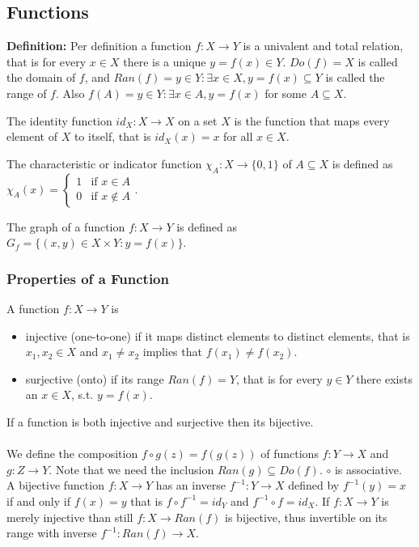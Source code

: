 \documentclass{article}
\begin{document}
\subsection{Functions}
\textbf{Definition:} Per definition a function $f: X \rightarrow Y$ is a univalent and total relation, that is for every $x \in X$ there is a unique $y = f(x) \in Y$. $Do(f) = X$ is called the domain of $f$, and $Ran(f) = {y \in Y: \exists x \in X, y = f (x)} \subseteq Y$ is called the range of $f$. Also $f(A) = {y \in Y: \exists x \in A, y = f(x)}$ for some $A \subseteq X$.

The identity function $id_X: X \rightarrow X$ on a set $X$ is the function that maps every element of $X$ to itself, that is $id_X (x) = x$ for all $x \in X$.

The characteristic or indicator function $\chi_A: X \rightarrow \{0,1\}$ of $A \subseteq X$ is defined as $\chi_A(x) = \begin{cases}
1 & \text{if } x \in A \\
0 & \text{if } x \notin A
\end{cases}$.

The graph of a function $f: X \rightarrow Y$ is defined as $G_f = \{(x,y) \in X \times Y:y=f(x)\}$.

\subsubsection{Properties of a Function}

A function $f: X \rightarrow Y$ is 
\begin{itemize}
    \item injective (one-to-one) if it maps distinct elements to distinct elements, that is $x_1, x_2 \in X$ and $x_1 \neq x_2$ implies that $f(x_1) \neq f(x_2)$.
    \item surjective (onto) if its range $Ran(f) = Y$, that is for every $y \in Y$ there exists an $x \in X$, s.t. $y = f(x)$.
\end{itemize}
If a function is both injective and surjective then its bijective.
\\\\
We define the composition $f \circ g(z)=f(g(z))$ of functions $f:Y \rightarrow X$ and $g:Z \rightarrow Y$. Note that we need the inclusion $Ran(g) \subseteq Do(f)$. $\circ$ is associative. A bijective function $f: X \rightarrow Y$ has an inverse $f^{-1}: Y \rightarrow X$ defined by $f^{-1}(y) =x$ if and only if $f(x) =y$ that is $f \circ f^{-1} = id_Y$ and $f^{-1} \circ f = id_X$. If $f: X \rightarrow Y$ is merely injective than still $f: X \rightarrow Ran(f)$ is bijective, thus invertible on its range with inverse $f^{-1}: Ran(f) \rightarrow X$.
\end{document}
